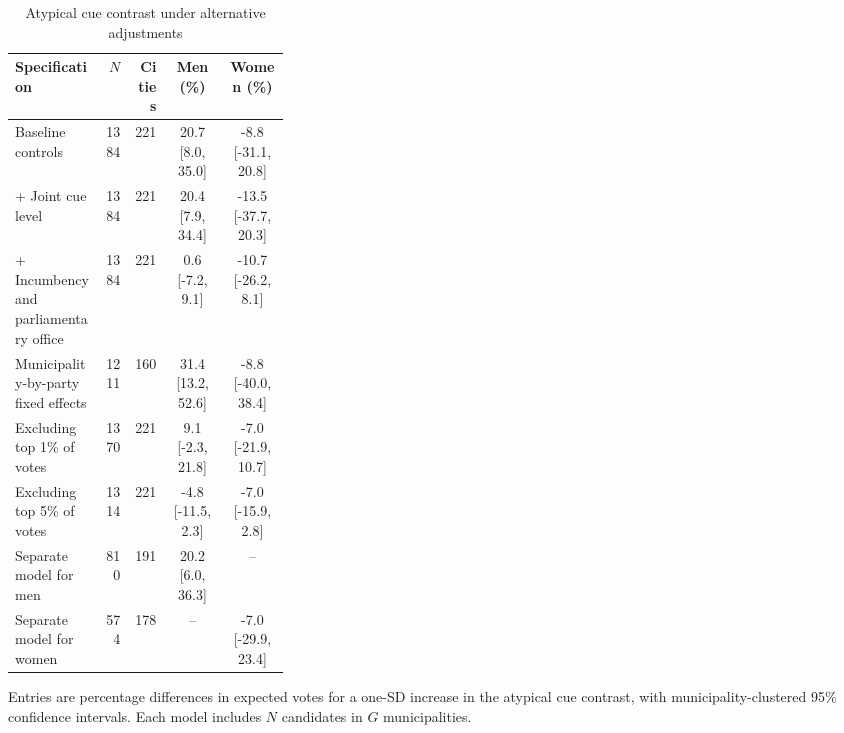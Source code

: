 \documentclass[11pt,a4paper]{article}\usepackage[]{graphicx}\usepackage[]{xcolor}
\begin{document}
\begin{table}[!htbp]
\centering
\caption{Atypical cue contrast under alternative adjustments}
\label{tab:oa-sensitivity}
\small\setlength{\tabcolsep}{3pt}
\begin{tabular}{p{0.32\linewidth}rrcc}
\toprule
Specification & $N$ & Cities & Men (\%) & Women (\%) \\
\midrule
Baseline controls & 1384 & 221 & 20.7 [8.0, 35.0] & -8.8 [-31.1, 20.8] \\
+ Joint cue level & 1384 & 221 & 20.4 [7.9, 34.4] & -13.5 [-37.7, 20.3] \\
+ Incumbency and parliamentary office & 1384 & 221 & 0.6 [-7.2, 9.1] & -10.7 [-26.2, 8.1] \\
Municipality-by-party fixed effects & 1211 & 160 & 31.4 [13.2, 52.6] & -8.8 [-40.0, 38.4] \\
Excluding top 1\% of votes & 1370 & 221 & 9.1 [-2.3, 21.8] & -7.0 [-21.9, 10.7] \\
Excluding top 5\% of votes & 1314 & 221 & -4.8 [-11.5, 2.3] & -7.0 [-15.9, 2.8] \\
Separate model for men & 810 & 191 & 20.2 [6.0, 36.3] & -- \\
Separate model for women & 574 & 178 & -- & -7.0 [-29.9, 23.4] \\
\bottomrule
\end{tabular}
\begin{minipage}{\linewidth}\footnotesize
Entries are percentage differences in expected votes for a one-SD increase in the atypical cue contrast, with municipality-clustered 95\% confidence intervals. Each model includes $N$ candidates in $G$ municipalities.
\end{minipage}
\end{table}

\FloatBarrier
\end{document}
